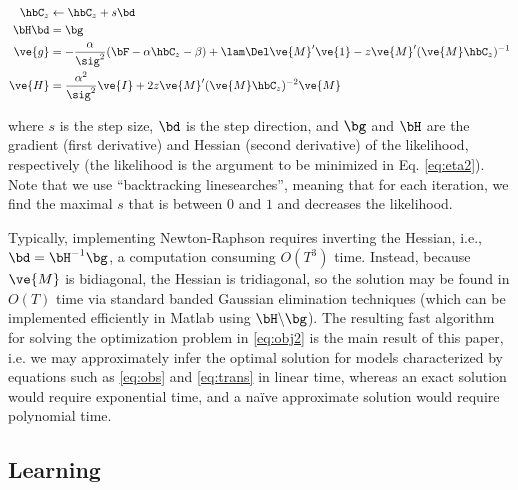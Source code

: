 \documentclass[12pt]{article}
\newcommand{\zzz}{z}
\begin{document}

\begin{subequations} \label{eq:NR}
\begin{align}
\hbC_{\zzz} &\leftarrow \hbC_{\zzz} + s \bd \\
\bH \bd &= \bg \\
\ve{g} &= -\frac{\alpha}{\sig^2}(\bF -\alpha \hbC_{\zzz} - \beta) + \lam \Del \ve{M}' \ve{1} - \zzz \ve{M}' (\ve{M} \hbC_{\zzz})^{-1} \label{eq:g} \\
\ve{H} &= \frac{\alpha^2}{\sig^2} \ve{I} + 2 \zzz \ve{M}' (\ve{M} \hbC_{\zzz})^{-2} \ve{M} \label{eq:H}
\end{align}
\end{subequations}

\noindent where $s$ is the step size, $\bd$ is the step direction, and $\bg$ and $\bH$ are the gradient (first derivative) and Hessian (second derivative) of the likelihood, respectively (the likelihood is the argument to be minimized in Eq. \eqref{eq:eta2}). Note that we use ``backtracking linesearches'', meaning that for each iteration, we find the maximal $s$ that is between $0$ and $1$ and decreases the likelihood.

Typically, implementing Newton-Raphson requires inverting the Hessian, i.e., $\bd = \bH^{-1} \bg$, a computation consuming $O(T^3)$ time. Instead, because $\ve{M}$ is bidiagonal, the Hessian is tridiagonal, so the solution may be found in $O(T)$ time via standard banded Gaussian elimination techniques (which can be implemented efficiently in Matlab using $\bH \backslash \bg$). The resulting fast algorithm for solving the optimization problem in \eqref{eq:obj2} is the main result of this paper, i.e.  we may approximately infer the optimal solution  for models characterized by equations such as \eqref{eq:obs} and \eqref{eq:trans} in linear time, whereas an exact solution would require exponential time, and a na\"{i}ve approximate solution would require polynomial time.  


\subsection{Learning} \label{sec:est}
\end{document}
